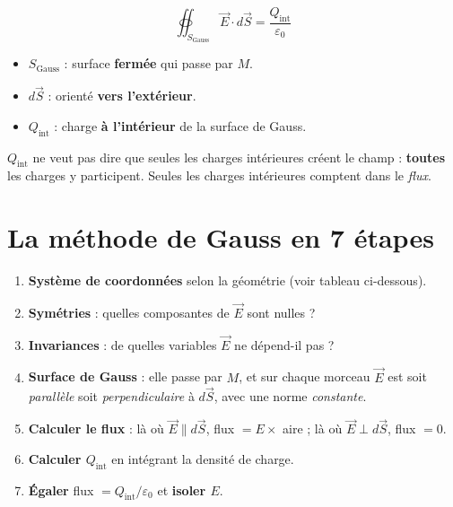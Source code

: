 \documentclass[11pt,a4paper]{article}
\newcommand{\vect}[1]{\overrightarrow{#1}}
\newcommand{\E}{\vect{E}}
\newcommand{\eps}{\varepsilon_0}
\newcommand{\Qint}{Q_{\mathrm{int}}}
\begin{document}
\begin{formule}
\[
\boxed{\;\oiint_{S_{\text{Gauss}}} \E\cdot d\vect{S}=\frac{\Qint}{\eps}\;}
\]
\begin{itemize}
  \item $S_{\text{Gauss}}$ : surface \textbf{fermée} qui passe par $M$.
  \item $d\vect{S}$ : orienté \textbf{vers l'extérieur}.
  \item $\Qint$ : charge \textbf{à l'intérieur} de la surface de Gauss.
\end{itemize}
\end{formule}

\begin{attention}
$\Qint$ ne veut pas dire que seules les charges intérieures créent le champ : \textbf{toutes} les charges y participent. Seules les charges intérieures comptent dans le \emph{flux}.
\end{attention}

\section{La méthode de Gauss en 7 étapes}

\begin{methode}
\begin{enumerate}[leftmargin=1.5em, itemsep=9pt]
  \item \textbf{Système de coordonnées} selon la géométrie (voir tableau ci-dessous).
  \item \textbf{Symétries} : quelles composantes de $\E$ sont nulles ?
  \item \textbf{Invariances} : de quelles variables $\E$ ne dépend-il pas ?
  \item \textbf{Surface de Gauss} : elle passe par $M$, et sur chaque morceau $\E$ est soit \emph{parallèle} soit \emph{perpendiculaire} à $d\vect{S}$, avec une norme \emph{constante}.
  \item \textbf{Calculer le flux} : là où $\E\parallel d\vect{S}$, flux $=E\times$ aire ; là où $\E\perp d\vect{S}$, flux $=0$.
  \item \textbf{Calculer $\Qint$} en intégrant la densité de charge.
  \item \textbf{Égaler} flux $=\Qint/\eps$ et \textbf{isoler $E$}.
\end{enumerate}
\end{methode}
\end{document}
